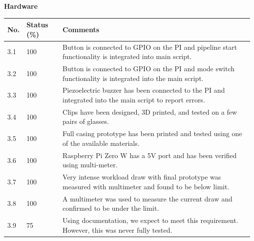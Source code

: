 \documentclass[a4paper,11pt]{article}
\begin{document}
\newpage
\textbf{Hardware}
\begin{table}[ht]
    \centering
    \begin{tabular}{|p{0.7cm}|p{1cm}|p{12cm}|}
        \hline
        No. & Status (\%) & Comments \\ \hline
        
        3.1 & 100 & Button is connected to GPIO on the PI and pipeline start functionality is integrated into main script. \\ \hline
        
        3.2 & 100 & Button is connected to GPIO on the PI and mode switch functionality is integrated into the main script. \\ \hline
        
        3.3 & 100 & Piezoelectric buzzer has been connected to the PI and integrated into the main script to report errors. \\ \hline
        
        3.4 & 100 & Clips have been designed, 3D printed, and tested on a few pairs of glasses. \\ \hline
        
        3.5 & 100 & Full casing prototype has been printed and tested using one of the available materials. \\ \hline
        
        3.6 & 100 & Raspberry Pi Zero W has a 5V port and has been verified using multi-meter. \\ \hline
        
        3.7 & 100 & Very intense workload draw with final prototype was measured with multimeter and found to be below limit. \\ \hline
        
        3.8 & 100 & A multimeter was used to measure the current draw and confirmed to be under the limit. \\ \hline
        
        3.9 & 75 & Using documentation, we expect to meet this requirement. However, this was never fully tested. \\ \hline

    \end{tabular}
\end{table}
\end{document}
